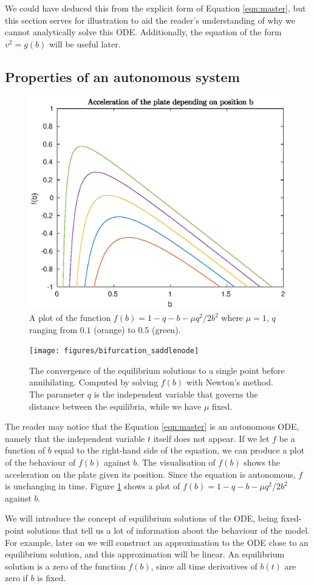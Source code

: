 We could have deduced this from the explicit form of Equation \ref{eqn:master},
but this section serves for illustration to aid the reader's understanding of why we cannot analytically solve this ODE.
Additionally, the equation of the form $v^2 = g(b)$ will be useful later.

\subsection{Properties of an autonomous system}

\begin{figure}[h!]
    \centering
    \includegraphics[width=0.5\linewidth]{figures/f_plot_mu_1_q_vary}
    \caption{A plot of the function $f(b) = 1-q-b-\mu q^2/2b^2$ where $\mu=1$, $q$ ranging from $0.1$ (orange) to $0.5$ (green).}
    \label{fig:acc_b_plot}
\end{figure}

\begin{figure}[h!]
	\centering
	\texttt{[image: figures/bifurcation\_saddlenode]}
	\caption{
		The convergence of the equilibrium solutions to a single point before annihilating. Computed by solving \(f(b)\) with Newton's method.
		The parameter \(q\) is the independent variable that governs the distance between the equilibria, while we have \(\mu\) fixed.
	}
	\label{fig:bifurcation}
\end{figure}
The reader may notice that the Equation \ref{eqn:master} is an autonomous ODE,
namely that the independent variable $t$ itself does not appear.
If we let $f$ be a function of $b$ equal to the right-hand side of the equation,
we can produce a plot of the behaviour of $f(b)$ against $b$.
The visualisation of $f(b)$ shows the acceleration on the plate given its position.
Since the equation is autonomous, $f$ is unchanging in time.
Figure \ref{fig:acc_b_plot} shows a plot of $f(b)= 1 - q - b - \mu q^2/2b^2$ against $b$.

We will introduce the concept of equilibrium solutions of the ODE,
being fixed-point solutions that tell us a lot of information about the behaviour of the model.
For example, later on we will construct an approximation to the ODE close to an equilibrium solution,
and this approximation will be linear.
An equilibrium solution is a zero of the function \(f(b)\), since all time derivatives of \(b(t)\) are zero if \(b\) is fixed.

